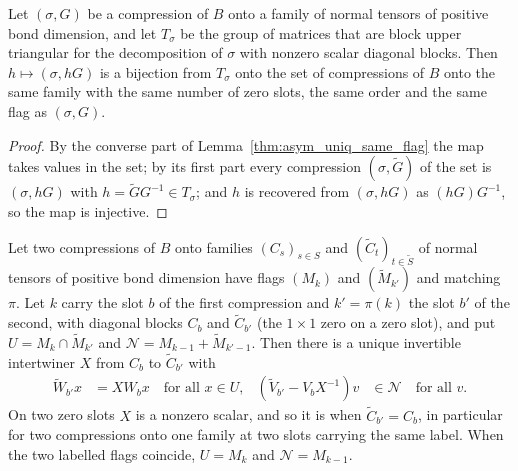 \begin{lemma}
    \label{thm:asym_uniq_torsor}
    \leanok
    Let $(\sigma,G)$ be a compression of $B$ onto a family of normal tensors of positive bond
    dimension, and let $T_\sigma$ be the group of matrices that are block upper triangular for the
    decomposition of $\sigma$ with nonzero scalar diagonal blocks. Then $h\mapsto(\sigma,hG)$ is a
    bijection from $T_\sigma$ onto the set of compressions of $B$ onto the same family with the same
    number of zero slots, the same order and the same flag as $(\sigma,G)$.
\end{lemma}

\begin{proof}
    \leanok
    By the converse part of Lemma~\ref{thm:asym_uniq_same_flag} the map takes values in the set;
    by its first part every compression $(\sigma,\widetilde G)$ of the set is $(\sigma,hG)$ with
    $h=\widetilde GG^{-1}\in T_\sigma$; and $h$ is recovered from $(\sigma,hG)$ as $(hG)G^{-1}$, so
    the map is injective.
\end{proof}

\begin{lemma}
    \label{thm:asym_uniq_different_flags}
    \leanok
    Let two compressions of $B$ onto families $(C_s)_{s\in S}$ and
    $(\widetilde C_t)_{t\in\widetilde S}$ of normal tensors of positive bond dimension have flags
    $(M_k)$ and $(\widetilde M_{k'})$ and matching $\pi$. Let $k$ carry the slot $b$ of the first
    compression and $k'=\pi(k)$ the slot $b'$ of the second, with diagonal blocks $C_b$ and
    $\widetilde C_{b'}$ (the $1\times1$ zero on a zero slot), and put $U=M_k\cap\widetilde M_{k'}$
    and $\mathcal N=M_{k-1}+\widetilde M_{k'-1}$. Then there is a unique invertible intertwiner $X$
    from $C_b$ to $\widetilde C_{b'}$ with
    \begin{align}
        \widetilde W_{b'}x             & =XW_bx\quad\text{for all }x\in U,    &
        (\widetilde V_{b'}-V_bX^{-1})v & \in\mathcal N\quad\text{for all }v .
    \end{align}
    On two zero slots $X$ is a nonzero scalar, and so it is when $\widetilde C_{b'}=C_b$, in
    particular for two compressions onto one family at two slots carrying the same label. When the
    two labelled flags coincide, $U=M_k$ and $\mathcal N=M_{k-1}$.
\end{lemma}

